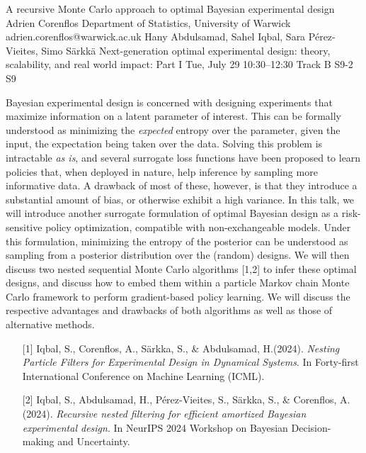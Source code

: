 \begin{talk}
  {A recursive Monte Carlo approach to optimal Bayesian experimental design}%
  {Adrien Corenflos}%
  {Department of Statistics, University of Warwick}%
  {adrien.corenflos@warwick.ac.uk}%
  {Hany Abdulsamad, Sahel Iqbal, Sara P\'erez-Vieites, Simo Särkkä}%
  {Next-generation optimal experimental design: theory, scalability, and real world impact: Part I}%
  {Tue, July 29 10:30–12:30 Track B}%
  {S9-2}%
  {S9}%
				
			
    Bayesian experimental design is concerned with designing experiments that maximize information on a latent parameter of interest. 
    This can be formally understood as minimizing the \emph{expected} entropy over the parameter, given the input, the expectation being taken over the data.
    Solving this problem is intractable \emph{as is}, and several surrogate loss functions have been proposed to learn policies that, when deployed in nature, help inference by sampling more informative data.
    A drawback of most of these, however, is that they introduce a substantial amount of bias, or otherwise exhibit a high variance.
    In this talk, we will introduce another surrogate formulation of optimal Bayesian design as a risk-sensitive policy optimization, compatible with non-exchangeable models.
    Under this formulation, minimizing the entropy of the posterior can be understood as sampling from a posterior distribution over the (random) designs.
    We will then discuss two nested sequential Monte Carlo algorithms [1,2] to infer these optimal designs, and discuss how to embed them within a particle Markov chain Monte Carlo framework to perform gradient-based policy learning. 
    We will discuss the respective advantages and drawbacks of both algorithms as well as those of alternative methods.
\medskip


\begin{enumerate}
	\item[{[1]}]Iqbal, S., Corenflos, A., Särkka, S., \&  Abdulsamad, H.(2024). {\it Nesting Particle Filters for Experimental Design in Dynamical Systems}. In Forty-first International Conference on Machine Learning (ICML).
	\item[{[2]}] Iqbal, S., Abdulsamad, H., Pérez-Vieites, S., Särkka, S., \& Corenflos, A. (2024). {\it Recursive nested filtering for efficient amortized Bayesian experimental design}. In NeurIPS 2024 Workshop on Bayesian Decision-making and Uncertainty.
\end{enumerate}

\end{talk}

